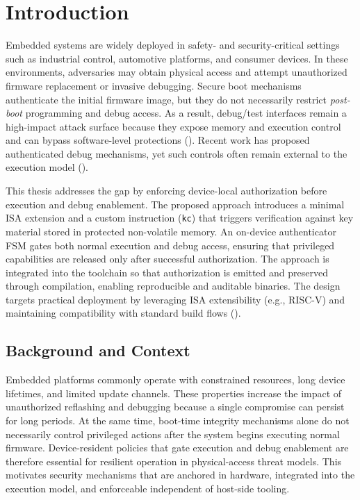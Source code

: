 \chapter{Introduction}
\label{Chapter1}

Embedded systems are widely deployed in safety- and security-critical settings such as
industrial control, automotive platforms, and consumer devices. In these environments,
adversaries may obtain physical access and attempt unauthorized firmware replacement or
invasive debugging. Secure boot mechanisms authenticate the initial firmware image, but
they do not necessarily restrict \emph{post-boot} programming and debug access. As a
result, debug/test interfaces remain a high-impact attack surface because they expose
memory and execution control and can bypass software-level protections
(\cite{ieee1149_1,ali2014boundaryscanattack}). Recent work has proposed authenticated
debug mechanisms, yet such controls often remain external to the execution model
(\cite{lapeyre2022jtagauth}).

This thesis addresses the gap by enforcing device-local authorization before execution
and debug enablement. The proposed approach introduces a minimal ISA extension and a
custom instruction (\texttt{kc}) that triggers verification against key material stored
in protected non-volatile memory. An on-device authenticator FSM gates both normal
execution and debug access, ensuring that privileged capabilities are released only
after successful authorization. The approach is integrated into the toolchain so that
authorization is emitted and preserved through compilation, enabling reproducible and
auditable binaries. The design targets practical deployment by leveraging ISA
extensibility (e.g., RISC-V) and maintaining compatibility with standard build flows
(\cite{waterman2014riscv,bin2020bootrom,rv2018securebootreview}).

\section{Background and Context}
Embedded platforms commonly operate with constrained resources, long device lifetimes,
and limited update channels. These properties increase the impact of unauthorized
reflashing and debugging because a single compromise can persist for long periods. At
the same time, boot-time integrity mechanisms alone do not necessarily control
privileged actions after the system begins executing normal firmware. Device-resident
policies that gate execution and debug enablement are therefore essential for resilient
operation in physical-access threat models. This motivates security mechanisms that are
anchored in hardware, integrated into the execution model, and enforceable independent
of host-side tooling.

